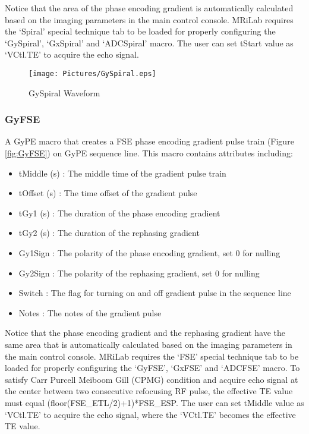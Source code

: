 \documentclass{book}%
\begin{document}
Notice that the area of the phase encoding gradient is automatically calculated based on the imaging parameters in the main control console. MRiLab requires the `Spiral' special technique tab to be loaded for properly configuring the `GySpiral', `GxSpiral' and `ADCSpiral' macro. The user can set tStart value as `VCtl.TE' to acquire the echo signal.

\begin{figure}[htbp]
	\centering
		\texttt{[image: Pictures/GySpiral.eps]}
	\caption{GySpiral Waveform}
	\label{fig:GySpiral}
\end{figure}


\subsubsection{GyFSE}

A GyPE macro that creates a FSE phase encoding gradient pulse train (Figure \ref{fig:GyFSE}) on GyPE sequence line. This macro contains attributes including:

\begin{itemize}
	\item tMiddle (s) : The middle time of the gradient pulse train
	\item tOffset (s) : The time offset of the gradient pulse
	\item tGy1 (s) : The duration of the phase encoding gradient
	\item tGy2 (s) : The duration of the rephasing gradient
	\item Gy1Sign : The polarity of the phase encoding gradient, set 0 for nulling
	\item Gy2Sign : The polarity of the rephasing gradient, set 0 for nulling
	\item Switch : The flag for turning on and off gradient pulse in the sequence line
	\item Notes : The notes of the gradient pulse 
\end{itemize}

Notice that the phase encoding gradient and the rephasing gradient have the same area that is automatically calculated based on the imaging parameters in the main control console. MRiLab requires the `FSE' special technique tab to be loaded for properly configuring the `GyFSE', `GxFSE' and `ADCFSE' macro. To satisfy Carr Purcell Meiboom Gill (CPMG) condition and acquire echo signal at the center between two consecutive refocusing RF pulse, the effective TE value must equal (floor(FSE\_ETL/2)+1)*FSE\_ESP. The user can set tMiddle value as `VCtl.TE' to acquire the echo signal, where the `VCtl.TE' becomes the effective TE value.
\end{document}
